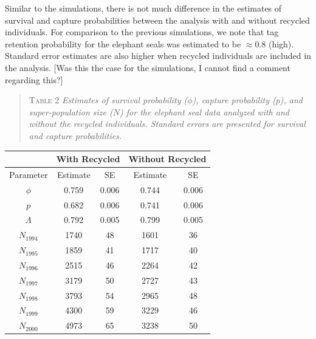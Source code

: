 \documentclass[]{article}
\begin{document}
Similar to the simulations, there is not much difference in the
estimates of survival and capture probabilities between the analysis
with and without recycled individuals. For comparison to the previous
simulations, we note that tag retention probability for the
elephant seals was estimated to be $\approx 0.8$ (high).  Standard error estimates are also higher when recycled individuals are included in the analysis. [Was this the case for the simulations, I cannot find a comment regarding this?]

\begin{quote}
\textsc{Table 2}
\textsl{Estimates of survival probability ($\phi$), capture probability ($p$), and super-population size ($N$) for the elephant seal data analyzed with and without the recycled individuals. Standard errors are presented for survival and capture probabilities.}
\end{quote}

\begin{center}
\begin{tabular}{c c c c c}
& \multicolumn{2}{l}{With Recycled} & \multicolumn{2}{l}{Without Recycled} \\ \hline
Parameter & Estimate & SE & Estimate & SE \\ \hline
$\phi$ & 0.759 & 0.006 & 0.744 & 0.006\\
$p$ & 0.682 & 0.006 & 0.741 & 0.006 \\
$\Lambda $ & 0.792 & 0.005 & 0.799 & 0.005\\ \hline
$N_{1994}$ & 1740 & 48 & 1601 & 36 \\
$N_{1995}$ & 1859 & 41 & 1717 & 40 \\
$N_{1996}$ & 2515 & 46 & 2264 & 42 \\
$N_{1997}$ & 3179 & 50 & 2727 & 43 \\
$N_{1998}$ & 3793 & 54 & 2965 & 48 \\
$N_{1999}$ & 4300 & 59 & 3229 & 46 \\
$N_{2000}$ & 4973 & 65 & 3238 & 50 \\ \hline
\end{tabular}
\end{center}
\end{document}
